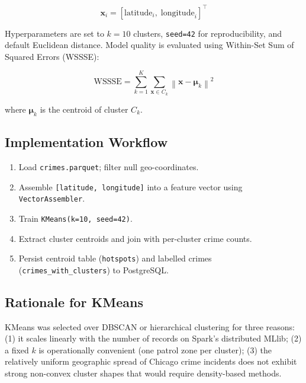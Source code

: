 \documentclass[11pt,a4paper]{article}
\begin{document}
\begin{equation}
\mathbf{x}_i = [\text{latitude}_i,\; \text{longitude}_i]^{\top}
\end{equation}

Hyperparameters are set to $k=10$ clusters, \texttt{seed=42} for
reproducibility, and default Euclidean distance. Model quality is
evaluated using Within-Set Sum of Squared Errors (WSSSE):

\begin{equation}
\text{WSSSE} = \sum_{k=1}^{K} \sum_{\mathbf{x} \in C_k}
  \left\| \mathbf{x} - \boldsymbol{\mu}_k \right\|^2
\end{equation}

where $\boldsymbol{\mu}_k$ is the centroid of cluster $C_k$.

\subsection{Implementation Workflow}

\begin{enumerate}[noitemsep]
  \item Load \texttt{crimes.parquet}; filter null geo-coordinates.
  \item Assemble \texttt{[latitude, longitude]} into a feature vector
    using \texttt{VectorAssembler}.
  \item Train \texttt{KMeans(k=10, seed=42)}.
  \item Extract cluster centroids and join with per-cluster crime counts.
  \item Persist centroid table (\texttt{hotspots}) and labelled crimes
    (\texttt{crimes\_with\_clusters}) to PostgreSQL.
\end{enumerate}

\subsection{Rationale for KMeans}

KMeans was selected over DBSCAN or hierarchical clustering for three
reasons:
(1) it scales linearly with the number of records on Spark's distributed
MLlib;
(2) a fixed $k$ is operationally convenient (one patrol zone per cluster);
(3) the relatively uniform geographic spread of Chicago crime incidents
does not exhibit strong non-convex cluster shapes that would require
density-based methods.

\end{document}
